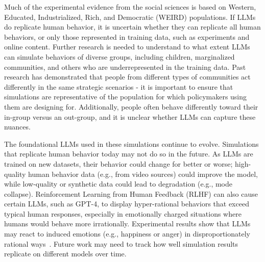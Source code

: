 Much of the experimental evidence from the social sciences is based on Western, Educated, Industrialized, Rich, and Democratic (WEIRD) populations. If LLMs do replicate human behavior, it is uncertain whether they can replicate all human behaviors, or only those represented in training data, such as experiments and online content. Further research is needed to understand to what extent LLMs can simulate behaviors of diverse groups, including children, marginalized communities, and others who are underrepresented in the training data. Past research has demonstrated that people from different types of communities act differently in the same strategic scenarios \cite{oosterbeek2004cultural, henrich2000does, kozitsina2020ethnicity} - it is important to ensure that simulations are representative of the population for which policymakers using them are designing for. \color{black} Additionally, people often behave differently toward their in-group versus an out-group, and it is unclear whether LLMs can capture these nuances.

The foundational LLMs used in these simulations continue to evolve. Simulations that replicate human behavior today may not do so in the future. As LLMs are trained on new datasets, their behavior could change for better or worse; high-quality human behavior data (e.g., from video sources) could improve the model, while low-quality or synthetic data could lead to degradation (e.g., mode collapse). Reinforcement Learning from Human Feedback (RLHF) can also cause certain LLMs, such as GPT-4, to display hyper-rational behaviors that exceed typical human responses, especially in emotionally charged situations where humans would behave more irrationally. Experimental results show that LLMs may react to induced emotions (e.g., happiness or anger) in disproportionately rational ways~\cite{mozikov2024good}. Future work may need to track how well simulation results replicate on different models over time.

